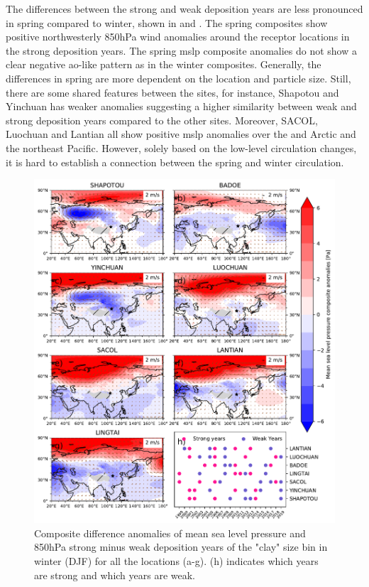 The differences between the strong and weak deposition years are less pronounced in spring compared to winter, shown in  and . 
The spring composites show positive northwesterly 850hPa wind anomalies around the receptor locations in the strong deposition years.
The spring \acrshort{mslp} composite anomalies do not show a clear negative \acrshort{ao}-like pattern as in the winter composites.
Generally, the differences in spring are more dependent on the location and particle size. 
Still, there are some shared features between the sites, for instance, Shapotou and Yinchuan has weaker anomalies suggesting a higher similarity between weak and strong deposition years compared to the other sites.
Moreover, SACOL, Luochuan and Lantian all show positive \acrshort{mslp} anomalies over the and Arctic and the northeast Pacific.
However, solely based on the low-level circulation changes, it is hard to establish a connection between the spring and winter circulation.

\begin{figure}[hp]
    \centering
    \includegraphics[width=\columnwidth]{texfiles/figs/mslp_850hPa_2micron_DJF.pdf}
    \caption{Composite difference anomalies of mean sea level pressure and 850hPa strong minus weak deposition years of the "clay" size bin in winter (DJF) for all the locations (a-g). (h) indicates which years are strong and which years are weak.}
    \label{fig:DJF_850_fine_composite}
\end{figure}

